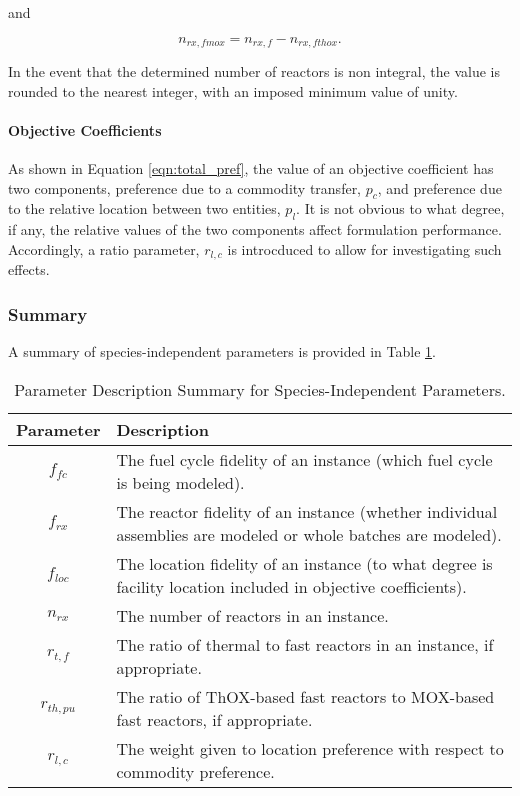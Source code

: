 and

\begin{equation}
n_{rx, fmox} = n_{rx, f} - n_{rx, fthox}.
\end{equation}

In the event that the determined number of reactors is non integral, the value
is rounded to the nearest integer, with an imposed minimum value of unity.

\paragraph{Objective Coefficients}

As shown in Equation \ref{eqn:total_pref}, the value of an objective coefficient
has two components, preference due to a commodity transfer, $p_c$, and
preference due to the relative location between two entities, $p_l$. It is not
obvious to what degree, if any, the relative values of the two components affect
formulation performance. Accordingly, a ratio parameter, $r_{l, c}$ is
introcduced to allow for investigating such effects.

\subsubsection{Summary}

A summary of species-independent parameters is provided in Table
\ref{tbl:global_params}.

\begin{table}[h]
\centering
\caption{Parameter Description Summary for Species-Independent Parameters.}
\label{tbl:global_params}
\begin{tabularx}{\columnwidth-10pt}{|c|X|} %
\hline
Parameter    & 
Description
\\ \hline
$f_{fc}$     & 
The fuel cycle fidelity of an instance (which fuel cycle is being modeled).
\\ \hline
$f_{rx}$   & 
The reactor fidelity of an instance (whether individual assemblies are modeled
or whole batches are modeled).  
\\ \hline
$f_{loc}$    & 
The location fidelity of an instance (to what degree is facility location
included in objective coefficients).
\\ \hline
$n_{rx}$   & 
The number of reactors in an instance.
\\ \hline
$r_{t, f}$   & 
The ratio of thermal to fast reactors in an instance, if appropriate.
\\ \hline
$r_{th, pu}$ & 
The ratio of ThOX-based fast reactors to MOX-based fast reactors, if appropriate.
\\ \hline
$r_{l, c}$ & 
The weight given to location preference with respect to commodity preference.
\\ \hline
\end{tabularx}
\end{table}

